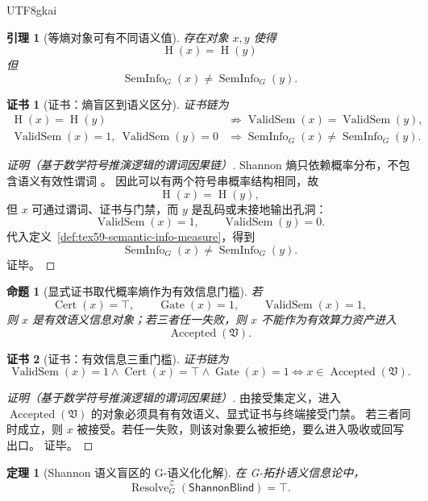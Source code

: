 \documentclass[12pt]{article}
\newtheorem{theorem}{定理}[section]
\newtheorem{proposition}{命题}[section]
\newtheorem{lemma}{引理}[section]
\newtheorem{Certificate}{证书}[section]
\newcommand{\Vsys}{\mathfrak V}
\DeclareMathOperator{\Cert}{Cert}
\DeclareMathOperator{\Accepted}{Accepted}
\DeclareMathOperator{\Resolve}{Resolve}
\DeclareMathOperator{\Gate}{Gate}
\DeclareMathOperator{\ValidSem}{ValidSem}
\DeclareMathOperator{\Entropy}{H}
\DeclareMathOperator{\SemInfo}{SemInfo}
\begin{document}
\begin{CJK*}{UTF8}{gkai}
\begin{lemma}[等熵对象可有不同语义值]
\label{lem:tex59-equal-entropy-different-semantics}
存在对象 \(x,y\) 使得
\[
  \Entropy(x)=\Entropy(y)
\]
但
\[
  \SemInfo_G(x)\ne\SemInfo_G(y).
\]
\end{lemma}

\begin{Certificate}[证书：熵盲区到语义区分]
\label{cert:tex59-equal-entropy-different-semantics}
证书链为
\[
  \begin{aligned}
  \Entropy(x)=\Entropy(y)
  &\not\Longrightarrow
  \ValidSem(x)=\ValidSem(y),\\
  \ValidSem(x)=1,\ \ValidSem(y)=0
  &\Longrightarrow
  \SemInfo_G(x)\ne\SemInfo_G(y).
  \end{aligned}
\]
\end{Certificate}

\begin{proof}[证明（基于数学符号推演逻辑的谓词因果链）]
Shannon 熵只依赖概率分布，不包含语义有效性谓词 \cite{Shannon1948Communication}。
因此可以有两个符号串概率结构相同，故
\[
  \Entropy(x)=\Entropy(y),
\]
但 \(x\) 可通过谓词、证书与门禁，而 \(y\) 是乱码或未接地输出孔洞：
\[
  \ValidSem(x)=1,\qquad \ValidSem(y)=0.
\]
代入定义~\ref{def:tex59-semantic-info-measure}，得到
\[
  \SemInfo_G(x)\ne\SemInfo_G(y).
\]
证毕。
\end{proof}

\begin{proposition}[显式证书取代概率熵作为有效信息门槛]
\label{prop:tex59-semantic-gate}
若
\[
  \Cert(x)=\top,\qquad \Gate(x)=1,\qquad \ValidSem(x)=1,
\]
则 \(x\) 是有效语义信息对象；若三者任一失败，则 \(x\) 不能作为有效算力资产进入
\[
  \Accepted(\Vsys).
\]
\end{proposition}

\begin{Certificate}[证书：有效信息三重门槛]
\label{cert:tex59-semantic-gate}
证书链为
\[
  \ValidSem(x)=1
  \wedge
  \Cert(x)=\top
  \wedge
  \Gate(x)=1
  \Longleftrightarrow
  x\in\Accepted(\Vsys).
\]
\end{Certificate}

\begin{proof}[证明（基于数学符号推演逻辑的谓词因果链）]
由接受集定义，进入 \(\Accepted(\Vsys)\) 的对象必须具有有效语义、显式证书与终端接受门禁。
若三者同时成立，则 \(x\) 被接受。若任一失败，则该对象要么被拒绝，要么进入吸收或回写出口。
证毕。
\end{proof}

\begin{theorem}[Shannon 语义盲区的 G-语义化化解]
\label{thm:tex59-shannon-resolution}
在 G-拓扑语义信息论中，
\[
  \Resolve_G^{\mathcal Z}(\mathsf{ShannonBlind})=\top.
\]
\end{theorem}


\end{CJK*}
\end{document}

